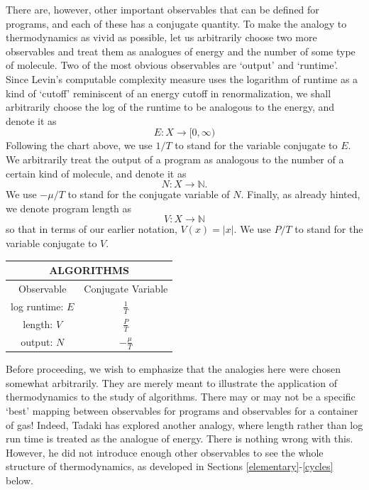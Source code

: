 \documentclass{article}
\newcommand{\N}{{\mathbb N}}
\renewcommand{\to}{\rightarrow}
\newcommand{\maps}{\colon}
\begin{document}
There are, however, other important observables that can be defined
for programs, and each of these has a conjugate quantity.  To make the
analogy to thermodynamics as vivid as possible, let us arbitrarily
choose two more observables and treat them as analogues of energy and
the number of some type of molecule.  Two of the most obvious
observables are `output' and `runtime'.  Since Levin's computable
complexity measure \cite{Levin1973} uses the logarithm of runtime as a
kind of `cutoff' reminiscent of an energy cutoff in renormalization,
we shall arbitrarily choose the log of the runtime to be analogous to
the energy, and denote it as
\[    E \maps X \to [0,\infty) \]
Following the chart above, we use $1/T$ to stand for the variable
conjugate to $E$.   We arbitrarily treat the output of a
program as analogous to the number of a certain kind of molecule, and
denote it as
\[    N \maps X \to \N . \]
We use $-\mu/T$ to stand for the conjugate variable of $N$.
Finally, as already hinted, we denote program length as
\[    V \maps X \to \N   \]
so that in terms of our earlier notation, $V(x) = |x|$.  We use
$P/T$ to stand for the variable conjugate to $V$.

\begin{center}
\renewcommand{\arraystretch}{2.3}
\begin{tabular}{c|c}	
\multicolumn{2}{c}{\bf{ALGORITHMS}} \\
\hline
Observable  & Conjugate Variable\\ 
\hline
log runtime: $E$  & $\displaystyle{\frac{1}{T}}$ \\
length:      $V$  & $\displaystyle{\frac{P}{T}}$  \\
output:      $N$  & $\displaystyle{-\frac{\mu}{T}}$   \\
\end{tabular}
\end{center}
\renewcommand{\arraystretch}{1}

Before proceeding, we wish to emphasize that the analogies here 
were chosen somewhat arbitrarily.  They are merely meant to illustrate
the application of thermodynamics to the study of algorithms.  There
may or may not be a specific `best' mapping between observables
for programs and observables for a container of gas!  Indeed, 
Tadaki \cite{Tadaki2008} has explored another analogy, where
length rather than log run time is treated as the analogue of 
energy.  There is nothing wrong with this.  However, he did not 
introduce enough other observables to see the whole structure of
thermodynamics, as developed in Sections \ref{elementary}-\ref{cycles}
below.  
\end{document}
